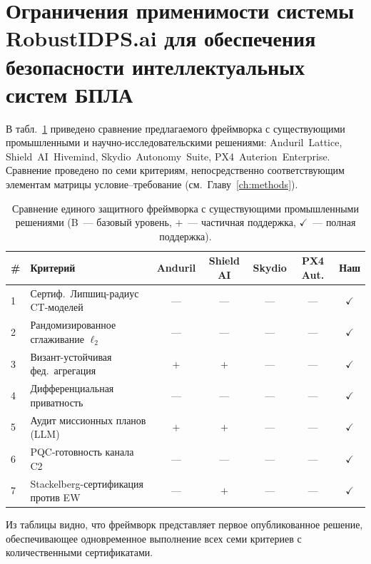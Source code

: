 \section{Ограничения применимости системы RobustIDPS.ai для обеспечения безопасности интеллектуальных систем БПЛА}
\label{sec:uav_comparison}

В табл.~\ref{tab:uav_industry_cmp} приведено сравнение предлагаемого
фреймворка с существующими промышленными и научно-исследовательскими
решениями: \mbox{Anduril~Lattice}, \mbox{Shield~AI~Hivemind},
\mbox{Skydio~Autonomy~Suite}, \mbox{PX4~Auterion~Enterprise}. Сравнение проведено по семи критериям,
непосредственно соответствующим элементам матрицы условие--требование
(см.~Главу~\ref{ch:methods}).

\begin{table}[H]
\centering
\caption{Сравнение единого защитного фреймворка с существующими
промышленными решениями (B~--- базовый уровень, $+$~--- частичная
поддержка, $\checkmark$~--- полная поддержка).}
\label{tab:uav_industry_cmp}
\small
\setlength{\tabcolsep}{3pt}
\renewcommand{\arraystretch}{1.15}
\begin{tabularx}{\linewidth}{@{}lXccccc@{}}
\toprule
\# & \textbf{Критерий}
   & \textbf{Anduril} & \textbf{Shield AI} & \textbf{Skydio} & \textbf{PX4 Aut.} & \textbf{Наш}\\
\midrule
1 & Сертиф.\ Липшиц-радиус CT-моделей           & ---   & ---   & ---   & ---   & $\checkmark$\\
2 & Рандомизированное сглаживание $\ell_2$       & ---   & ---   & ---   & ---   & $\checkmark$\\
3 & Визант-устойчивая фед.\ агрегация            & $+$   & $+$   & ---   & ---   & $\checkmark$\\
4 & Дифференциальная приватность                 & ---   & ---   & ---   & ---   & $\checkmark$\\
5 & Аудит миссионных планов (LLM)                & $+$   & $+$   & ---   & ---   & $\checkmark$\\
6 & PQC-готовность канала C2                     & ---   & ---   & ---   & ---   & $\checkmark$\\
7 & Stackelberg-сертификация против EW           & ---   & $+$   & ---   & ---   & $\checkmark$\\
\bottomrule
\end{tabularx}
\end{table}

Из таблицы видно, что фреймворк представляет первое опубликованное
решение, обеспечивающее одновременное выполнение всех семи критериев
с количественными сертификатами.


